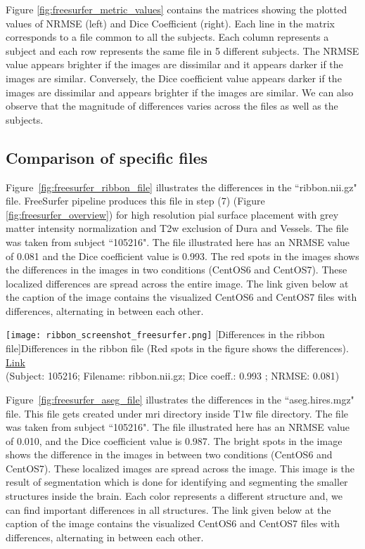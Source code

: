 Figure \ref{fig:freesurfer_metric_values} contains the matrices showing the plotted values of NRMSE (left) and Dice Coefficient (right). Each line in the matrix corresponds to a file common to all the subjects. Each column represents a subject and each row represents the same file in 5 different subjects. The NRMSE value appears brighter if the images are dissimilar and it appears darker if the images are similar. Conversely, the Dice coefficient value appears darker if the images are dissimilar and appears brighter if the images are similar. We can also observe that the magnitude of differences varies across the files as well as the subjects.

\subsection{Comparison of specific files}
Figure~\ref{fig:freesurfer_ribbon_file} illustrates the differences in the ``ribbon.nii.gz" file. FreeSurfer pipeline produces this file in step (7) (Figure \ref{fig:freesurfer_overview}) for high resolution pial surface placement with grey matter intensity normalization and T2w exclusion of Dura and Vessels.
The file was taken from subject ``105216". The file illustrated here has an NRMSE value of 0.081 and the Dice coefficient value is 0.993. The red spots in the images shows the differences in the images in two conditions (CentOS6 and CentOS7). These localized differences are spread across the entire image.
The link given below at the caption of the image contains the visualized CentOS6 and CentOS7 files with differences, alternating in between each other.

\begin{center}
\texttt{[image: ribbon\_screenshot\_freesurfer.png]}
[Differences in the ribbon file]{Differences in the ribbon file (Red spots in the figure shows the differences). \href{https://drive.google.com/file/d/14nQNb9qNxqgpUrl4D1P6BYplXsGpNUx_/view?usp=sharing}{Link}\\(Subject: 105216; Filename: ribbon.nii.gz; Dice coeff.: 0.993 ; NRMSE: 0.081)}
\label{fig:freesurfer_ribbon_file}
\end{center}

Figure~\ref{fig:freesurfer_aseg_file} illustrates the differences in the ``aseg.hires.mgz" file. This file gets created under mri directory inside T1w file directory. The file was taken from subject ``105216". The file illustrated here has an NRMSE value of 0.010, and the Dice coefficient value is 0.987. The bright spots in the image shows the difference in the images in between two conditions (CentOS6 and CentOS7). These localized images are spread across the image. This image is the result of segmentation which is done for identifying and segmenting the smaller structures inside the brain. Each color represents a different structure and, we can find important differences in all structures. The link given below at the caption of the image contains the visualized CentOS6 and CentOS7 files with differences, alternating in between each other.

